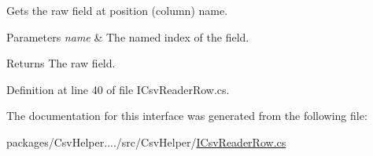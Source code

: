Gets the raw field at position (column) name. 


\begin{DoxyParams}{Parameters}
{\em name} & The named index of the field.\\
\hline
\end{DoxyParams}
\begin{DoxyReturn}{Returns}
The raw field.
\end{DoxyReturn}


Definition at line 40 of file I\-Csv\-Reader\-Row.\-cs.



The documentation for this interface was generated from the following file\-:\begin{DoxyCompactItemize}
\item 
packages/\-Csv\-Helper..../src/\-Csv\-Helper/\hyperlink{a00248}{I\-Csv\-Reader\-Row.\-cs}\end{DoxyCompactItemize}
